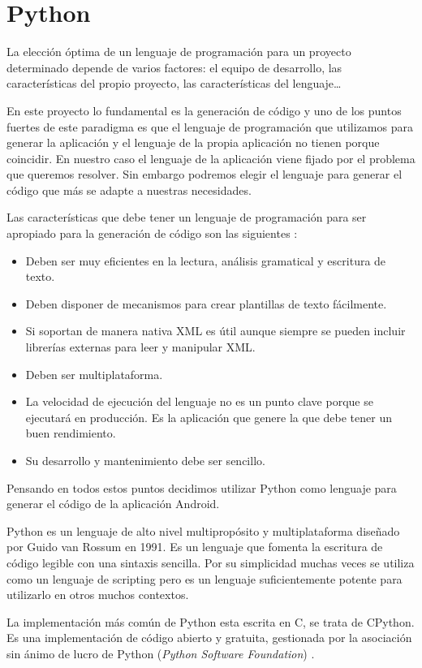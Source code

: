 \section{Python}
La elección óptima de un lenguaje de programación para un proyecto determinado depende de varios factores: el equipo de desarrollo, las características del propio proyecto, las características del lenguaje\ldots\par
En este proyecto lo fundamental es la generación de código y uno de los puntos fuertes de este paradigma es que el lenguaje de programación que utilizamos para generar la aplicación y el lenguaje de la propia aplicación no tienen porque coincidir. En nuestro caso el lenguaje de la aplicación viene fijado por el problema que queremos resolver. Sin embargo podremos elegir el lenguaje para generar el código que más se adapte a nuestras necesidades.\par
Las características que debe tener un lenguaje de programación para ser apropiado para la generación de código son las siguientes \cite{herrington2003code}:
\begin{itemize}
\item Deben ser muy eficientes en la lectura, análisis gramatical y escritura de texto.
\item Deben disponer de mecanismos para crear plantillas de texto fácilmente.
\item Si soportan de manera nativa XML es útil aunque siempre se pueden incluir librerías externas para leer y manipular XML.
\item Deben ser multiplataforma.
\item La velocidad de ejecución del lenguaje no es un punto clave porque se ejecutará en producción. Es la aplicación que genere la que debe tener un buen rendimiento.
\item Su desarrollo y mantenimiento debe ser sencillo. 
\end{itemize}
\medskip\par
Pensando en todos estos puntos decidimos utilizar Python como lenguaje para generar el código de la aplicación Android.\par
Python es un lenguaje de alto nivel multipropósito y multiplataforma diseñado por Guido van Rossum en 1991. Es un lenguaje que fomenta la escritura de código legible con una sintaxis sencilla. Por su simplicidad muchas veces se utiliza como un lenguaje de scripting pero es un lenguaje suficientemente potente para utilizarlo en otros muchos contextos.\par
La implementación más común de Python esta escrita en C, se trata de CPython. Es una implementación de código abierto y gratuita, gestionada por la asociación sin ánimo de lucro  de Python (\emph{Python Software Foundation}) \cite{python}.\medskip\par
